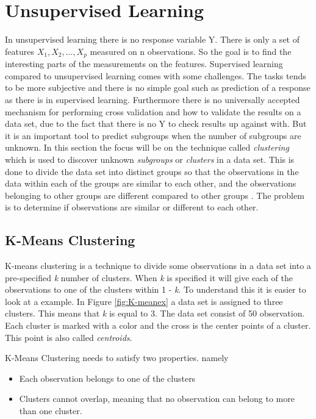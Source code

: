 \chapter{Unsupervised Learning}
\label{chp:unsuplea}
In unsupervised learning there is no response variable Y. There is only a set of features $X_1, X_2,..., X_p$ measured on n observations. So the goal is to find the interesting parts of the measurements on the features.
Supervised learning compared to unsupervised learning comes with some challenges. The tasks tends to be more subjective and there is no simple goal such as prediction of a response as there is in supervised learning. Furthermore there is no universally accepted mechanism for performing cross validation and how to validate the results on a data set, due to the fact that there is no Y to check results up against with.
But it is an important tool to predict subgroups when the number of subgroups are unknown.
In this section the focus will be on the  technique called \emph{clustering} which is used to discover unknown \emph{subgroups} or \emph{clusters} in a data set. This is done to divide the data set into distinct groups so that the observations in the data within each of the groups are similar to each other, and the observations belonging to other groups are different compared to other groups . 
The problem is to determine if observations are similar or different to each other.
 
\section{K-Means Clustering}
\label{chp:clus}
K-means clustering is a technique to divide some observations in a data set into a pre-specified \emph{k} number of clusters. When \emph{k} is specified it will give each of the observations to one of the clusters within 1 - \emph{k}. To understand this it is easier to look at a example. In
Figure \ref{fig:K-meanex} a data set is assigned to three clusters. This means that \emph{k} is equal to 3. The data set consist of 50 observation. Each cluster is marked with a color and the cross is the center points of a cluster. This point is also called \emph{centroids}.


K-Means Clustering needs to satisfy two properties. namely
\begin{itemize}
	\item Each observation belongs to one of the clusters
	\item Clusters cannot overlap, meaning that no observation can belong to more than one cluster.
\end{itemize} 

